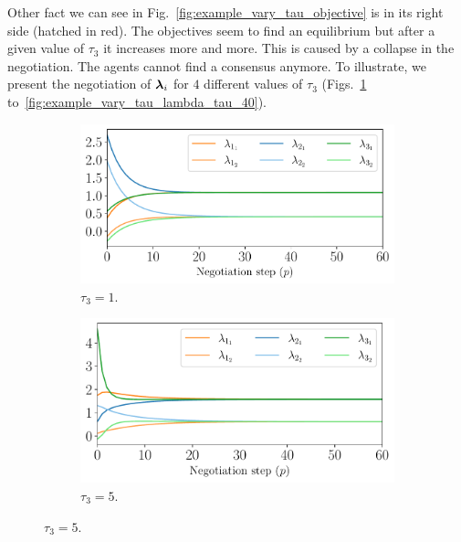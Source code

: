 \documentclass[../main.tex]{subfiles}
\begin{document}
Other fact we can see in Fig.~\ref{fig:example_vary_tau_objective} is in its right side (hatched in red). The objectives seem to find an equilibrium but after a given value of $\tau_{3}$ it increases more and more.
This is caused by a collapse in the negotiation.
The agents cannot find a consensus anymore.
To illustrate, we present the negotiation of $\boldsymbol{\lambda}_i$ for $4$ different values of $\tau_{3}$ (Figs.~\ref{fig:example_vary_tau_lambda_tau_1} to~\ref{fig:example_vary_tau_lambda_tau_40}).

\begin{figure}[h]
  \centering
  \begin{subfigure}{0.45\textwidth}
    \includegraphics[width=\textwidth]{../img/example_primal_decomposition/example_vary_tau_lambda_tau_1.0.pdf}
    \caption{$\tau_{3}=1$.}\label{fig:example_vary_tau_lambda_tau_1}
  \end{subfigure}
  \begin{subfigure}{0.45\textwidth}
    \includegraphics[width=\textwidth]{../img/example_primal_decomposition/example_vary_tau_lambda_tau_5.0.pdf}
    \caption{$\tau_{3}=5$.}\label{fig:example_vary_tau_lambda_tau_5}
  \end{subfigure}

\end{figure}
\end{document}
